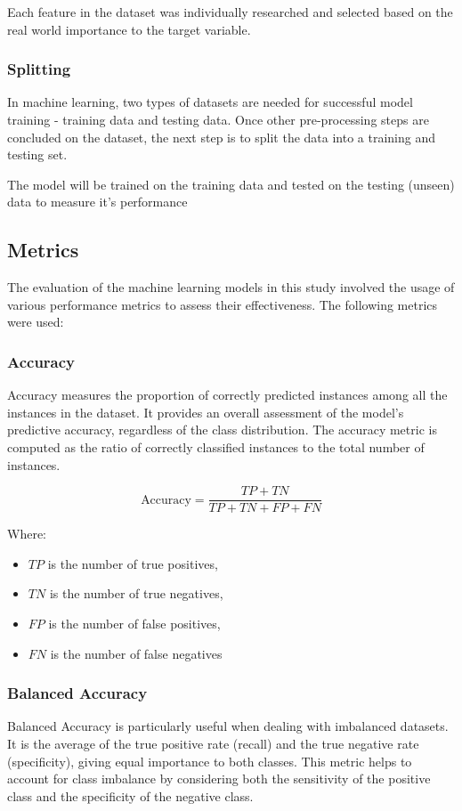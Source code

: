 \documentclass[12pt, a4paper,twoside]{report}
\numberwithin{equation}{chapter}
\begin{document}
Each feature in the dataset was individually researched and selected based on the real world importance to the target variable.

\subsubsection{Splitting}

In machine learning, two types of datasets are needed for successful model training - training data and testing data. Once other pre-processing steps are concluded on the dataset, the next step is to split the data into a training and testing set. 

The model will be trained on the training data and tested on the testing (unseen) data to measure it's performance

\subsection{Metrics}

The evaluation of the machine learning models in this study involved the usage of various performance metrics to assess their effectiveness. The following metrics were used:

\subsubsection{Accuracy}
Accuracy measures the proportion of correctly predicted instances among all the instances in the dataset. It provides an overall assessment of the model's predictive accuracy, regardless of the class distribution. The accuracy metric is computed as the ratio of correctly classified instances to the total number of instances.

\[
\text{Accuracy} = \frac{TP + TN}{TP + TN + FP + FN}
\]

Where:

\begin{itemize}
    \item \(TP\) is the number of true positives,
    \item \(TN\) is the number of true negatives,
    \item \(FP\) is the number of false positives,
    \item \(FN\) is the number of false negatives
\end{itemize}

\subsubsection{Balanced Accuracy}
Balanced Accuracy is particularly useful when dealing with imbalanced datasets. It is the average of the true positive rate (recall) and the true negative rate (specificity), giving equal importance to both classes. This metric helps to account for class imbalance by considering both the sensitivity of the positive class and the specificity of the negative class.
\end{document}

